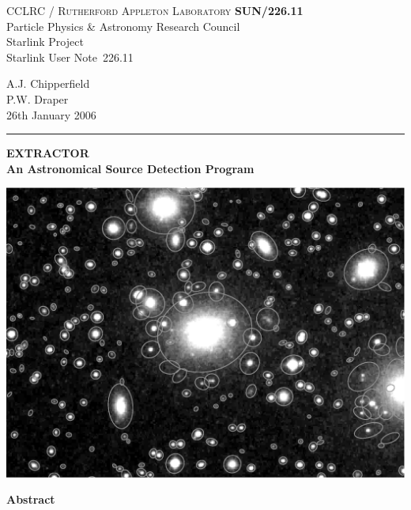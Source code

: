 \documentclass[twoside,11pt]{article}
\newcommand{\stardoccategory}  {Starlink User Note}
\newcommand{\stardocinitials}  {SUN}
\newcommand{\stardocnumber}    {226.11}
\newcommand{\stardocauthors}   {A.J. Chipperfield\\
                                P.W. Draper}
\newcommand{\stardocdate}      {26th January 2006}
\newcommand{\stardoctitle}     {EXTRACTOR\\
                                An Astronomical Source Detection Program}
\newcommand{\stardocname}{\stardocinitials /\stardocnumber}
\newenvironment{latexonly}{}{}
\renewcommand{\_}{\texttt{\symbol{95}}}
\begin{document}
\thispagestyle{empty}

\begin{latexonly}
   CCLRC / \textsc{Rutherford Appleton Laboratory} \hfill \textbf{\stardocname}\\
   {\large Particle Physics \& Astronomy Research Council}\\
   {\large Starlink Project\\}
   {\large \stardoccategory\ \stardocnumber}
   \begin{flushright}
   \stardocauthors\\
   \stardocdate
   \end{flushright}
   \vspace{-4mm}
   \rule{\textwidth}{0.5mm}
   \vspace{4mm}
   \begin{center}
   {\LARGE\textbf{\stardoctitle} \\ [2.5ex]}
   \vspace{4mm}

   \includegraphics[scale=0.6]{sun226fig.ps}
   \end{center}

   \vspace{5mm}
   \begin{center}
      {\Large\textbf{Abstract}}
   \end{center}
\end{latexonly}
\end{document}
